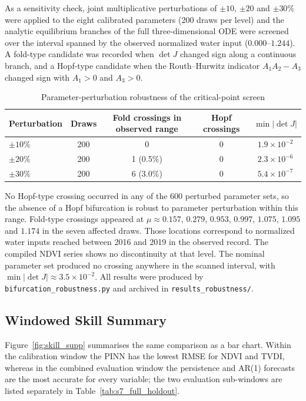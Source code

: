 \documentclass[12pt,a4paper]{article}
\begin{document}
As a sensitivity check, joint
multiplicative perturbations of $\pm10$, $\pm20$ and $\pm30\%$ were applied to the eight
calibrated parameters (200 draws per level) and the analytic equilibrium branches of the full
three-dimensional ODE were screened over the interval spanned by the observed normalized water
input ($0.000$--$1.244$). A fold-type candidate was recorded when $\det J$ changed sign along
a continuous branch, and a Hopf-type candidate when the Routh--Hurwitz indicator
$A_1A_2-A_3$ changed sign with $A_1>0$ and $A_3>0$.

\begin{table}[H]
	\centering
	\caption{Parameter-perturbation robustness of the critical-point screen}
	\label{tab:robust_supp}
	\small
	\begin{tabular}{lcccc}
		\toprule
		Perturbation & Draws & Fold crossings in observed range & Hopf crossings & $\min|\det J|$ \\
		\midrule
		$\pm10\%$ & 200 & 0 & 0 & $1.9\times10^{-2}$ \\
		$\pm20\%$ & 200 & 1 (0.5\%) & 0 & $2.3\times10^{-6}$ \\
		$\pm30\%$ & 200 & 6 (3.0\%) & 0 & $5.4\times10^{-7}$ \\
		\bottomrule
	\end{tabular}
\end{table}

No Hopf-type crossing occurred in any of the 600 perturbed parameter sets, so the absence of a
Hopf bifurcation is robust to parameter perturbation within this range. Fold-type crossings
appeared at $\mu\approx0.157$, $0.279$, $0.953$, $0.997$, $1.075$, $1.095$ and $1.174$ in the
seven affected draws. Those locations correspond to normalized water inputs reached between 2016
and 2019 in the observed record. The compiled NDVI series shows no discontinuity at that level.
The nominal parameter set produced no crossing
anywhere in the scanned interval, with $\min|\det J|\approx3.5\times10^{-2}$. All results were
produced by \texttt{bifurcation\_robustness.py} and archived in \texttt{results\_robustness/}.

\subsection{Windowed Skill Summary}

Figure~\ref{fig:skill_supp} summarises the same comparison as a bar chart. Within the calibration window the PINN has the lowest RMSE for NDVI and TVDI, whereas in the combined evaluation window the persistence and AR(1) forecasts are the most accurate for every variable; the two evaluation sub-windows are listed separately in Table~\ref{tab:s7_full_holdout}.
\end{document}
